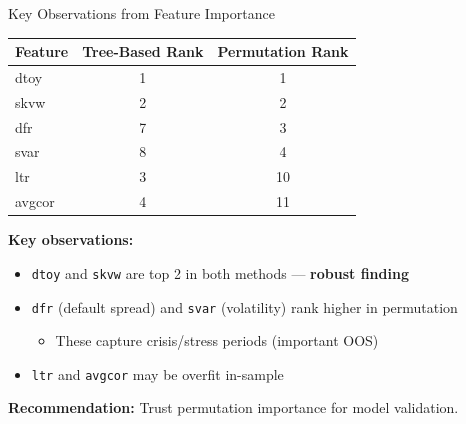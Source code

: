 \documentclass[10pt]{beamer}
\newcommand{\highlight}[1]{\textcolor{AccentOrange}{\textbf{#1}}}
\begin{document}

\begin{frame}{Key Observations from Feature Importance}

  \begin{center}
  \begin{tabular}{lcc}
    \toprule
    \textbf{Feature} & \textbf{Tree-Based Rank} & \textbf{Permutation Rank} \\
    \midrule
    dtoy & 1 & 1 \\
    skvw & 2 & 2 \\
    dfr & 7 & 3 \\
    svar & 8 & 4 \\
    ltr & 3 & 10 \\
    avgcor & 4 & 11 \\
    \bottomrule
  \end{tabular}
  \end{center}

  \vspace{0.5em}
  \textbf{Key observations:}
  \begin{itemize}
    \item \texttt{dtoy} and \texttt{skvw} are top 2 in both methods --- \highlight{robust finding}
    \item \texttt{dfr} (default spread) and \texttt{svar} (volatility) rank higher in permutation
    \begin{itemize}
      \item These capture crisis/stress periods (important OOS)
    \end{itemize}
    \item \texttt{ltr} and \texttt{avgcor} may be overfit in-sample
  \end{itemize}

  \vspace{0.3em}
  \textbf{Recommendation:} Trust permutation importance for model validation.
\end{frame}

\end{document}
